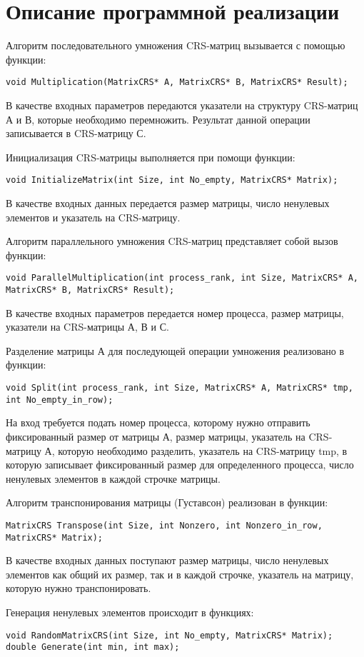 \documentclass{report}
\begin{document}
\section*{Описание программной реализации}
Алгоритм последовательного умножения CRS-матриц вызывается с помощью функции:
\begin{lstlisting}
void Multiplication(MatrixCRS* A, MatrixCRS* B, MatrixCRS* Result);
\end{lstlisting}
\par В качестве входных параметров передаются указатели на структуру CRS-матриц А и В, которые необходимо перемножить. Результат данной операции записывается в CRS-матрицу С.
\par Инициализация CRS-матрицы выполняется при помощи функции:
\begin{lstlisting}
void InitializeMatrix(int Size, int No_empty, MatrixCRS* Matrix);
\end{lstlisting}
\par В качестве входных данных передается размер матрицы, число ненулевых элементов и указатель на CRS-матрицу.
\par Алгоритм параллельного умножения CRS-матриц представляет собой вызов функции:
\begin{lstlisting}
void ParallelMultiplication(int process_rank, int Size, MatrixCRS* A, MatrixCRS* B, MatrixCRS* Result);
\end{lstlisting}
\par В качестве входных параметров передается номер процесса, размер матрицы, указатели на CRS-матрицы А, В и С.
\par Разделение матрицы А для последующей операции умножения реализовано в функции:
\begin{lstlisting}
void Split(int process_rank, int Size, MatrixCRS* A, MatrixCRS* tmp, int No_empty_in_row);
\end{lstlisting}
\par На вход требуется подать номер процесса, которому нужно отправить фиксированный размер от матрицы А, размер матрицы, указатель на CRS-матрицу А, которую необходимо разделить, указатель на CRS-матрицу tmp, в которую записывает фиксированный размер для определенного процесса, число ненулевых элементов в каждой строчке матрицы.
\newpage
\par Алгоритм транспонирования матрицы (Густавсон) реализован в функции:
\begin{lstlisting}
MatrixCRS Transpose(int Size, int Nonzero, int Nonzero_in_row, MatrixCRS* Matrix);
\end{lstlisting}
\par В качестве входных данных поступают размер матрицы, число ненулевых элементов как общий их размер, так и в каждой строчке, указатель на матрицу, которую нужно транспонировать.
\par Генерация ненулевых элементов происходит в функциях:
\begin{lstlisting}
void RandomMatrixCRS(int Size, int No_empty, MatrixCRS* Matrix);
double Generate(int min, int max);
\end{lstlisting}
\newpage
\end{document}
